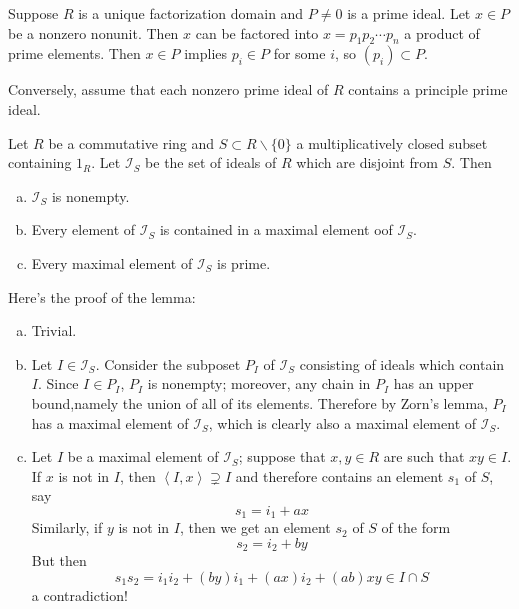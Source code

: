\begin{answer}
    Suppose $R$ is a unique factorization domain and $P\neq 0$ is a prime ideal. Let $x\in P$ be a nonzero nonunit. Then $x$ can be factored into $x=p_{1}p_{2}\cdots p_{n}$ a product of prime elements. Then $x\in P$ implies $p_{i}\in P$ for some $i$, so $(p_{i})\subset P$.

    Conversely, assume that each nonzero prime ideal of $R$ contains a principle prime ideal.

    \begin{lemma}
        Let $R$ be a commutative ring and $S\subset R\backslash \{0\}$ a multiplicatively closed subset containing $1_{R}$. Let $\mathcal{I}_{S}$ be the set of ideals of $R$ which are disjoint from $S$. Then
        \begin{enumerate}[(a)]
            \item $\mathcal{I}_{S}$ is nonempty.
            \item Every element of $\mathcal{I}_{S}$ is contained in a maximal element oof $\mathcal{I}_{S}$.
            \item Every maximal element of $\mathcal{I}_{S}$ is prime.
        \end{enumerate}
    \end{lemma}
    
    Here's the proof of the lemma:
    \begin{enumerate}[(a)]
        \item Trivial.
        \item Let $I\in \mathcal{I}_{S}$. Consider the subposet $P_{I}$ of $\mathcal{I}_{S}$ consisting of ideals which contain $I$. Since $I\in P_{I}$, $P_{I}$ is nonempty; moreover, any chain in $P_{I}$ has an upper bound,namely the union of all of its elements. Therefore by Zorn's lemma, $P_{I}$ has a maximal element of $\mathcal{I}_{S}$, which is clearly also a maximal element of $\mathcal{I}_{S}$. 
        \item Let $I$ be a maximal element of $\mathcal{I}_{S}$; suppose that $x,y\in R$ are such that $xy\in I$. If $x$ is not in $I$, then $\left\langle I,x\right\rangle\supsetneq I$ and therefore contains an element $s_{1}$ of $S$, say \[s_{1}=i_{1}+ax\] Similarly, if $y$ is not in $I$, then we get an element $s_{2}$ of $S$ of the form \[s_{2}=i_{2}+by\] But then \[s_{1}s_{2}=i_{1}i_{2}+(by)i_{1}+(ax)i_{2}+(ab)xy\in I\cap S\] a contradiction! 
    \end{enumerate}


\end{answer}
